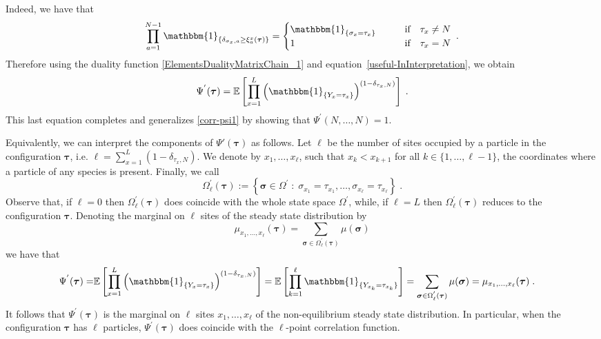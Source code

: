 \documentclass[10pt]{article}
\numberwithin{equation}{section}
\numberwithin{equation}{subsection}
\newcommand{\dt}{\;.}
\begin{document}
{Indeed, we have that 
\begin{equation}
	\prod_{a=1}^{N-1}\mathbbm{1}_{\{\delta_{\sigma_{x},a}\geq\xi_{a}^{x}(\bm{\tau})\}}=\begin{cases}
		\mathbbm{1}_{\{\sigma_{x}=\tau_{x}\}}\qquad &\text{if}\quad \tau_{x}\neq N\\
		1\qquad  &\text{if}\quad \tau_{x}= N
	\end{cases}\dt
\end{equation}
Therefore using the duality function \eqref{ElementsDualityMatrixChain_1} and equation~\ref{useful-InInterpretation}, we obtain 
\begin{equation}
	\Psi^{'}(\bm{\tau})=\mathbb{E}\left[\prod_{x=1}^{L}\left(\mathbbm{1}_{\{Y_{x}=\tau_{x}\}} \right)^{(1-\delta_{\tau_{x},N})}\right]\dt
\end{equation} 
This last equation completes and generalizes \eqref{corr-psi1} by showing that $\Psi^{'}(N,\ldots,N) =1$.

Equivalently, we can interpret the components of $\Psi'(\bm{\tau})$ as follows.
Let $\ell$ be the number of sites {\color{black}occupied by a particle} in the configuration $\bm{\tau}$, i.e.  $\ell=\sum_{x=1}^{L}(1-\delta_{\tau_{x},N})$. We denote by $x_{1},\ldots,x_{\ell}$, such that $x_{k}<x_{k+1}$ for all $k\in \{1,\ldots,\ell-1\}$, the coordinates where a particle of any species is present. Finally, we call 
\begin{equation}
	\Omega_{\ell}^{'}(\bm{\tau}):=\left\{\bm{\sigma}\in \Omega^{'}\;:\; \sigma_{x_{1}}=\tau_{x_{1}},\ldots,\sigma_{x_{\ell}}=\tau_{x_{\ell}}\right\}\dt
\end{equation} 
Observe that, if $\ell=0$ then $\Omega_{\ell}^{'}(\bm{\tau})$ does coincide with the whole state space $\Omega^{'}$, while, if $\ell=L$ then $\Omega_{\ell}^{'}(\bm{\tau})$ reduces to the configuration $\bm{\tau}$. Denoting the marginal on $\ell$ sites of the steady state distribution by 
\begin{equation}
	\mu_{x_{1},\ldots,x_{\ell}}(\bm{\tau})=\sum_{\bm{\sigma}\in \Omega_{\ell}^{'}(\bm{\tau})}\mu(\bm{\sigma})
\end{equation}
we have that 
\begin{align}
	\Psi^{'}(\bm{\tau})=&\mathbb{E}\left[\prod_{x=1}^{L}\left(\mathbbm{1}_{\{Y_{x}=\tau_{x}\}} \right)^{(1-\delta_{\tau_{x},N})}\right]=\mathbb{E}\left[\prod_{k=1}^{\ell}\mathbbm{1}_{\{Y_{x_{k}}=\tau_{x_{k}}\}}\right]=\sum_{\bm{\sigma}\in \Omega_{\ell}^{'}(\bm{\tau})}\mu(\bm{\sigma})=\mu_{x_{1},\ldots,x_{\ell}}(\bm{\tau})\dt
\end{align} 
It follows that $\Psi^{'}(\bm{\tau})$ is the marginal on $\ell$ sites $x_{1},\ldots,x_{\ell}$ of the non-equilibrium steady state distribution. In particular, when the configuration $\bm{\tau}$ has $\ell$ particles, $\Psi^{'}(\bm{\tau})$ does coincide with the $\ell$-point correlation function. 


}
\end{document}
